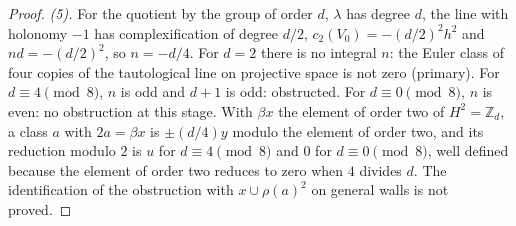 \begin{proof}
\emph{(5).} For the quotient by the group of order $d$, $\lambda$ has degree $d$, the line with holonomy $-1$ has complexification of degree $d/2$, $c_{2}(V_{0}) = -(d/2)^{2}h^{2}$ and $n d = -(d/2)^{2}$, so $n = -d/4$. For $d = 2$ there is no integral $n$: the Euler class of four copies of the tautological line on projective space is not zero (primary). For $d \equiv 4 \pmod 8$, $n$ is odd and $d + 1$ is odd: obstructed. For $d \equiv 0 \pmod 8$, $n$ is even: no obstruction at this stage. With $\beta x$ the element of order two of $H^{2} = \mathbb{Z}_{d}$, a class $a$ with $2a = \beta x$ is $\pm(d/4)y$ modulo the element of order two, and its reduction modulo $2$ is $u$ for $d \equiv 4 \pmod 8$ and $0$ for $d \equiv 0 \pmod 8$, well defined because the element of order two reduces to zero when $4$ divides $d$. The identification of the obstruction with $x \cup \rho(a)^{2}$ on general walls is not proved.
\end{proof}
